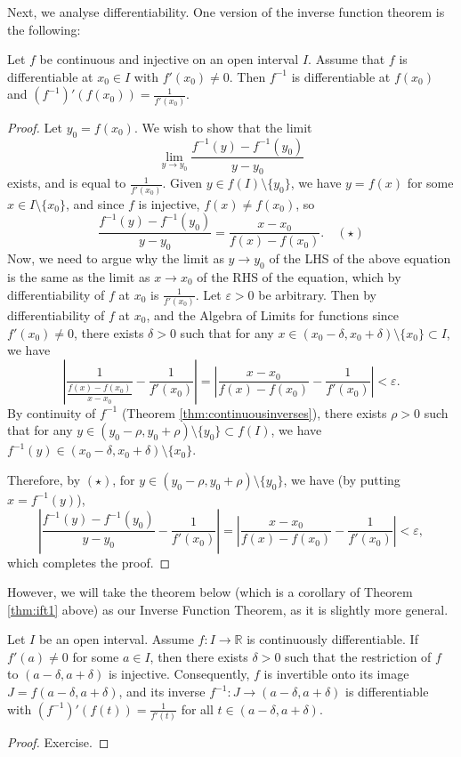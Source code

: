 \documentclass[../analysis1.tex]{subfiles}
\begin{document}
Next, we analyse differentiability. One version of the inverse function theorem is the following:
\begin{theorem}
\label{thm:ift1}
    \begin{shaded*}
        Let $f$ be continuous and injective on an open interval $I$. Assume that $f$ is differentiable at $x_0\in I$ with $f'(x_0)\ne 0$. Then $f^{-1}$ is differentiable at $f(x_0)$ and $\left(f^{-1}\right)'(f(x_0))=\frac{1}{f'(x_0)}$.
    \end{shaded*}
\end{theorem} 
\begin{proof}
    Let $y_0=f(x_0)$. We wish to show that the limit \[\lim_{y\to y_0}\frac{f^{-1}(y)-f^{-1}(y_0)}{y-y_0}\]
    exists, and is equal to $\frac{1}{f'(x_0)}$. Given $y\in f(I)\setminus \{y_0\}$, we have $y=f(x)$ for some $x\in I\setminus\{x_0\}$, and since $f$ is injective, $f(x)\ne f(x_0)$, so
    \[\frac{f^{-1}(y)-f^{-1}(y_0)}{y-y_0}=\frac{x-x_0}{f(x)-f(x_0)}.\quad (\star)\]
    Now, we need to argue why the limit as $y\to y_0$ of the LHS of the above equation is the same as the limit as $x\to x_0$ of the RHS of the equation, which by differentiability of $f$ at $x_0$ is $\frac{1}{f'(x_0)}$. Let $\varepsilon>0$ be arbitrary. Then by differentiability of $f$ at $x_0$, and the Algebra of Limits for functions since $f'(x_0)\ne 0$, there exists $\delta>0$ such that for any $x\in (x_0-\delta,x_0+\delta)\setminus\{x_0\}\subset I$, we have
    \[\left|\frac{1}{\frac{f(x)-f(x_0)}{x-x_0}}-\frac{1}{f'(x_0)}\right|=\left|\frac{x-x_0}{f(x)-f(x_0)}-\frac{1}{f'(x_0)}\right|<\varepsilon.\]
    By continuity of $f^{-1}$ (Theorem \ref{thm:continuousinverses}), there exists $\rho > 0$ such that for any $y\in (y_0-\rho,y_0+\rho)\setminus\{y_0\}\subset f(I)$, we have $f^{-1}(y)\in (x_0-\delta,x_0+\delta)\setminus\{x_0\}$.
    
    Therefore, by $(\star)$, for $y\in (y_0-\rho,y_0+\rho)\setminus\{y_0\}$, we have (by putting $x=f^{-1}(y)$),
    \[\left|\frac{f^{-1}(y)-f^{-1}(y_0)}{y-y_0}-\frac{1}{f'(x_0)}\right|=\left|\frac{x-x_0}{f(x)-f(x_0)}-\frac{1}{f'(x_0)}\right|<\varepsilon,\]
    which completes the proof.\qedhere
\end{proof}
However, we will take the theorem below (which is a corollary of Theorem \ref{thm:ift1} above) as our Inverse Function Theorem, as it is slightly more general.

\begin{theorem}
\label{thm:ift}
    \begin{shaded*}
        Let $I$ be an open interval. Assume $f : I \to \mathbb{R}$ is continuously differentiable. If $f'(a) \neq 0$ for some $a \in I$, then there exists $\delta > 0$ such that the restriction of $f$ to $(a - \delta, a + \delta)$ is injective. Consequently, $f$ is invertible onto its image $J = f(a - \delta, a + \delta)$, and its inverse $f^{-1} : J \to (a - \delta, a + \delta)$ is differentiable with $(f^{-1})'(f(t)) = \frac{1}{f'(t)}$ for all $t \in (a - \delta, a + \delta)$.
    \end{shaded*}
\end{theorem}
\begin{proof}
    Exercise.
\end{proof}
\end{document}
